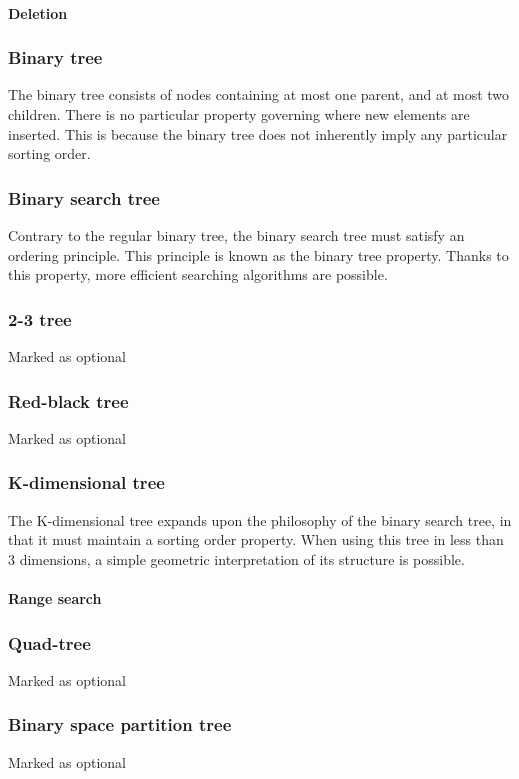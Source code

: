 \documentclass{article}
\begin{document}
\paragraph{Deletion}
\subsubsection{Binary tree}
The binary tree consists of nodes containing at most one parent, and at most two children.
There is no particular property governing where new elements are inserted.
This is because the binary tree does not inherently imply any particular sorting order.

\subsubsection{Binary search tree}
Contrary to the regular binary tree, the binary search tree must satisfy an ordering principle.
This principle is known as the binary tree property. Thanks to this property,
more efficient searching algorithms are possible.

\subsubsection{2-3 tree}
Marked as optional

\subsubsection{Red-black tree}
Marked as optional

\subsubsection{K-dimensional tree}
The K-dimensional tree expands upon the philosophy of the binary search tree, in that it
must maintain a sorting order property. When using this tree in less than 3 dimensions,
a simple geometric interpretation of its structure is possible.

\paragraph{Range search}

\subsubsection{Quad-tree}
Marked as optional

\subsubsection{Binary space partition tree}
Marked as optional
\end{document}
